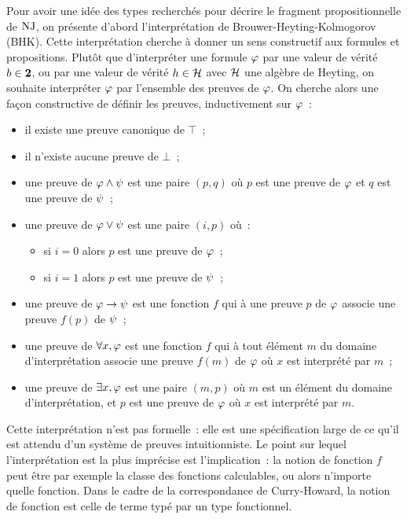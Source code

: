 Pour avoir une idée des types recherchés pour décrire le fragment
propositionnelle de $\operatorname{NJ}$, on présente d'abord l'interprétation de
Brouwer-Heyting-Kolmogorov (BHK). Cette interprétation cherche à donner un
sens constructif aux formules et propositions. Plutôt que d'interpréter une
formule $\varphi$ par une valeur de vérité $b \in \bm{2}$, ou par une valeur de
vérité $h \in \mathcal{H}$ avec $\mathcal{H}$ une algèbre de Heyting, on souhaite
interpréter $\varphi$ par l'ensemble des preuves de $\varphi$. On cherche alors
une façon constructive de définir les preuves, inductivement sur $\varphi$~:
\begin{itemize}
\item il existe une preuve canonique de $\top$~;
\item il n'existe aucune preuve de $\bot$~;
\item une preuve de $\varphi \land \psi$ est une paire $(p,q)$ où $p$ est une
  preuve de $\varphi$ et $q$ est une preuve de $\psi$~;
\item une preuve de $\varphi \lor \psi$ est une paire $(i,p)$ où~:
  \begin{itemize}
  \item si $i = 0$ alors $p$ est une preuve de $\varphi$~;
  \item si $i = 1$ alors $p$ est une preuve de $\psi$~;
  \end{itemize}
\item une preuve de $\varphi \to \psi$ est une fonction $f$ qui à une preuve
  $p$ de $\varphi$ associe une preuve $f(p)$ de $\psi$~;
\item une preuve de $\forall x, \varphi$ est une fonction $f$ qui à tout
  élément $m$ du domaine d'interprétation associe une preuve $f(m)$ de
  $\varphi$ où $x$ est interprété par $m$~;
\item une preuve de $\exists x, \varphi$ est une paire $(m,p)$ où
  $m$ est un élément du domaine d'interprétation, et $p$ est une preuve
  de $\varphi$ où $x$ est interprété par $m$.
\end{itemize}
Cette interprétation n'est pas formelle~: elle est une spécification large de ce
qu'il est attendu d'un système de preuves intuitionniste. Le point sur lequel
l'interprétation est la plus imprécise est l'implication~: la notion de fonction
$f$ peut être par exemple la classe des fonctions calculables, ou alors
n'importe quelle fonction. Dans le cadre de la correspondance de Curry-Howard,
la notion de fonction est celle de terme typé par un type fonctionnel.

